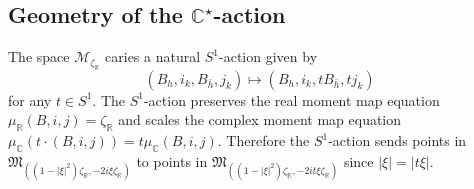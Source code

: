 \documentclass[12pt,oneside,reqno]{amsart}
\theoremstyle{definition}
\numberwithin{equation}{section}
\numberwithin{theorem}{section}
\newcommand{\R}{\mathbb{R}}
\newcommand{\C}{\mathbb{C}}
\begin{document}
\subsection{Geometry of the $\C^{\star}$-action}

The space $\mathcal M_{\zeta_{\R}}$ caries a natural $S^1$-action given by 
%
\begin{equation}
(B_h,i_k,B_{\bar h}, j_k) \longmapsto (B_h,i_k,tB_{\bar h}, tj_k)
\end{equation}
%
for any $t\in S^1$. The $S^1$-action preserves the real moment map equation $\mu_{\R}(B,i,j) = \zeta_{\R}$ and scales the complex moment map equation $\mu_{\C}(t\cdot(B,i,j)) = t\mu_{\C}(B,i,j)$. Therefore the $S^1$-action sends points in $\mathfrak M_{((1-|\xi| ^2)\zeta_{\R},-2i\xi \zeta_{\R})}$ to points in $\mathfrak M_{((1-|\xi| ^2)\zeta_{\R},-2it\xi \zeta_{\R})}$ since $|\xi| = |t\xi|$. 
\end{document}
